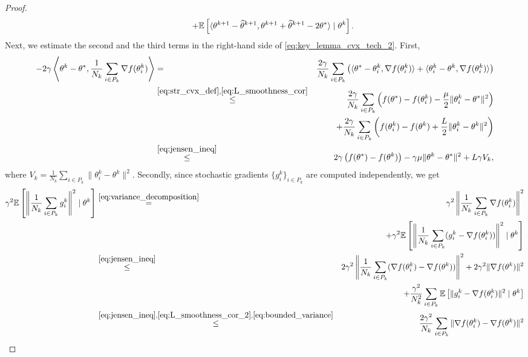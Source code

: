 \begin{proof}
\begin{eqnarray}
    &&\quad +  \mathbb{E}\left[\langle\theta^{k+1} - \widehat{\theta}^{k+1}, \theta^{k+1}+\widehat{\theta}^{k+1} - 2\theta^*\rangle\mid \theta^k\right]. \label{eq:key_lemma_cvx_tech_2}
\end{eqnarray}
Next, we estimate the second and the third terms in the right-hand side of \eqref{eq:key_lemma_cvx_tech_2}. First,
\begin{eqnarray}
    -2\gamma\left\langle\theta^k - \theta^*, \frac{1}{N_k}\sum\limits_{i\in P_k}\nabla f(\theta_i^k)\right\rangle &=& \frac{2\gamma}{N_k}\sum\limits_{i\in P_k}\left(\langle\theta^* - \theta_i^k, \nabla f(\theta_i^k) \rangle + \langle\theta_i^k - \theta^k, \nabla f(\theta_i^k) \rangle \right)\notag\\
    &\overset{\eqref{eq:str_cvx_def},\eqref{eq:L_smoothness_cor}}{\le}& \frac{2\gamma}{N_k}\sum\limits_{i\in P_k}\left( f(\theta^*) - f(\theta_i^k) - \frac{\mu}{2}\|\theta_i^k - \theta^*\|^2\right)\notag\\
    &&\quad + \frac{2\gamma}{N_k}\sum\limits_{i\in P_k}\left(f(\theta_i^k) - f(\theta^k) + \frac{L}{2}\|\theta_i^k - \theta^k\|^2\right)\notag\\
    &\overset{\eqref{eq:jensen_ineq}}{\le}& 2\gamma\left(f(\theta^*) - f(\theta^k)\right) -\gamma\mu\|\theta^k - \theta^*\|^2 + L\gamma V_k, \label{eq:key_lemma_cvx_tech_3}
\end{eqnarray}
where $V_k = \frac{1}{N_k}\sum_{i\in P_k}\|\theta_i^k - \theta^k\|^2$. Secondly, since stochastic gradients $\{g_i^k\}_{i\in P_k}$ are computed independently, we get
\begin{eqnarray}
    \gamma^2\EE\left[\left\|\frac{1}{N_k}\sum\limits_{i\in P_k}g_i^k\right\|^2\mid \theta^k\right] &\overset{\eqref{eq:variance_decomposition}}{=}& \gamma^2\left\|\frac{1}{N_k}\sum\limits_{i\in P_k}\nabla f(\theta_i^k)\right\|^2\notag\\
    &&\quad + \gamma^2\EE\left[\left\|\frac{1}{N_k}\sum\limits_{i\in P_k}(g_i^k-\nabla f(\theta_i^k))\right\|^2\mid \theta^k\right]\notag\\
    &\overset{\eqref{eq:jensen_ineq}}{\le}& 2\gamma^2 \left\|\frac{1}{N_k}\sum\limits_{i\in P_k}(\nabla f(\theta_i^k)-\nabla f(\theta^k))\right\|^2 + 2\gamma^2\|\nabla f(\theta^k)\|^2 \notag\\
    &&\quad + \frac{\gamma^2}{N_k^2}\sum\limits_{i\in P_k}\EE\left[\|g_i^k - \nabla f(\theta_i^k)\|^2\mid \theta^k\right]\notag\\
    &\overset{\eqref{eq:jensen_ineq},\eqref{eq:L_smoothness_cor_2},\eqref{eq:bounded_variance}}{\le}& \frac{2\gamma^2}{N_k}\sum\limits_{i\in P_k}\|\nabla f(\theta_i^k)-\nabla f(\theta^k)\|^2 \notag\\

\end{eqnarray}
\end{proof}
